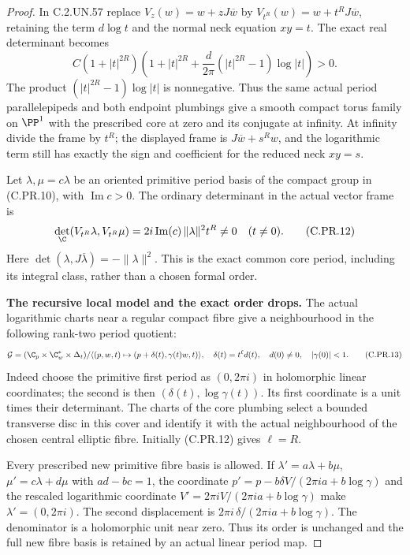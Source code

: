 \begin{proof}
In C.2.UN.57 replace $V_z(w)=w+zJ\overline w$ by
$V_{t^R}(w)=w+t^RJ\overline w$, retaining the term
$d\log t$ and the normal neck equation $xy=t$.
The exact real determinant becomes
\[
 C(1+|t|^{2R})
 \left(1+|t|^{2R}
       +\frac{d}{2\pi}(|t|^{2R}-1)\log|t|\right)>0.
                                                        \tag{C.PR.11}
\]
The product $(|t|^{2R}-1)\log|t|$ is nonnegative.
Thus the same actual period parallelepipeds and both endpoint
plumbings give a smooth compact torus family on $\PP^1$ with
the prescribed core at zero and its conjugate at infinity.
At infinity divide the frame by $t^R$; the displayed frame is
$J\overline w+s^Rw$, and the logarithmic term still has exactly
the sign and coefficient for the reduced neck $xy=s$.

Let $\lambda,\mu=c\lambda$ be an oriented primitive period basis
of the compact group in (C.PR.10), with $\operatorname{Im}c>0$.
The ordinary determinant in the actual vector frame is
\[
 \det_{\C}(V_{t^R}\lambda,V_{t^R}\mu)
       =2i\operatorname{Im}(c)\,\|\lambda\|^2 t^R\ne0
                      \quad(t\ne0).                    \tag{C.PR.12}
\]
Here $\det(\lambda,J\overline\lambda)=-\|\lambda\|^2$.
This is the exact common core period, including its integral
class, rather than a chosen formal order.

\par\medskip\noindent\textbf{The recursive local model and the exact order drops.}
The actual logarithmic charts near a regular compact fibre give
a neighbourhood in the following rank-two period quotient:
\[
 \mathcal G=
 (\C_p\times\C_w^*\times\Delta_t)/
 \langle(p,w,t)\mapsto(p+\delta(t),\gamma(t)w,t)\rangle,
 \quad
 \delta(t)=t^\ell d(t),\quad d(0)\ne0,\quad|\gamma(0)|<1 .
                                                        \tag{C.PR.13}
\]
Indeed choose the primitive first period as $(0,2\pi i)$ in
holomorphic linear coordinates; the second is then
$(\delta(t),\log\gamma(t))$. Its first coordinate is a unit
times their determinant. The charts of the core plumbing select
a bounded transverse disc in this cover and identify it with
the actual neighbourhood of the chosen central elliptic fibre.
Initially (C.PR.12) gives $\ell=R$.

Every prescribed new primitive fibre basis is allowed. If
$\lambda'=a\lambda+b\mu$, $\mu'=c\lambda+d\mu$ with
$ad-bc=1$, the coordinate
$p'=p-b\delta V/(2\pi ia+b\log\gamma)$ and the rescaled
logarithmic coordinate
$V'=2\pi iV/(2\pi ia+b\log\gamma)$ make $\lambda'=(0,2\pi i)$.
The second displacement is
$2\pi i\,\delta/(2\pi ia+b\log\gamma)$.
The denominator is a holomorphic unit near zero.
Thus its order is unchanged and the full new fibre basis is
retained by an actual linear period map.


\end{proof}
